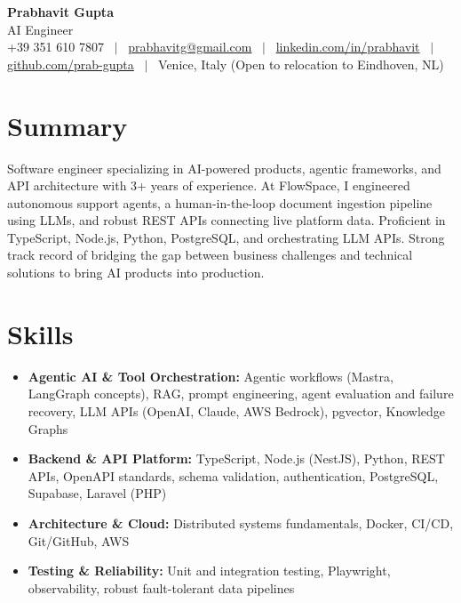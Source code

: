\documentclass[a4paper,10pt]{article}
\begin{document}
\begin{center}
 {\Huge\bfseries Prabhavit Gupta}\\[3pt]
 {\color{accent}\large AI Engineer}\\[6pt]
 {\footnotesize +39 351 610 7807 ~$\vert$~
 \href{mailto:prabhavitg@gmail.com}{prabhavitg@gmail.com} ~$\vert$~
 \href{https://www.linkedin.com/in/prabhavit/}{linkedin.com/in/prabhavit} ~$\vert$~
 \href{https://github.com/prab-gupta}{github.com/prab-gupta} ~$\vert$~
 Venice, Italy (Open to relocation to Eindhoven, NL)}
\end{center}
\vspace{-5pt}

\section{Summary}
Software engineer specializing in AI-powered products, agentic frameworks, and API architecture with 3+ years of experience. At FlowSpace, I engineered autonomous support agents, a human-in-the-loop document ingestion pipeline using LLMs, and robust REST APIs connecting live platform data. Proficient in TypeScript, Node.js, Python, PostgreSQL, and orchestrating LLM APIs. Strong track record of bridging the gap between business challenges and technical solutions to bring AI products into production.

\section{Skills}
\begin{itemize}
 \item \textbf{Agentic AI \& Tool Orchestration:} Agentic workflows (Mastra, LangGraph concepts), RAG, prompt engineering, agent evaluation and failure recovery, LLM APIs (OpenAI, Claude, AWS Bedrock), pgvector, Knowledge Graphs
 \item \textbf{Backend \& API Platform:} TypeScript, Node.js (NestJS), Python, REST APIs, OpenAPI standards, schema validation, authentication, PostgreSQL, Supabase, Laravel (PHP)
 \item \textbf{Architecture \& Cloud:} Distributed systems fundamentals, Docker, CI/CD, Git/GitHub, AWS
 \item \textbf{Testing \& Reliability:} Unit and integration testing, Playwright, observability, robust fault-tolerant data pipelines
\end{itemize}
\end{document}
